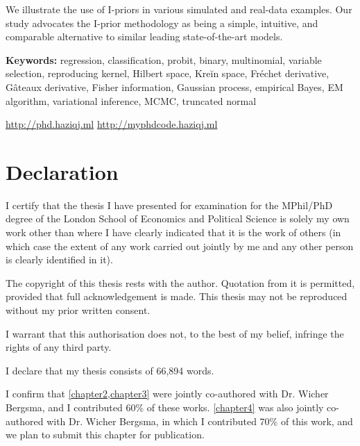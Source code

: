 \documentclass[11pt,twoside,openright,showframe]{report}
\begin{document}
We illustrate the use of I-priors in various simulated and real-data examples. 
Our study advocates the I-prior methodology as being a simple, intuitive, and comparable alternative to similar leading state-of-the-art models. 


\vspace{1em}
{\noindent\textbf{Keywords:} 
	regression, classification, probit, binary, multinomial, variable selection, reproducing kernel, Hilbert space, Kreĭn space, Fréchet derivative, Gâteaux derivative, Fisher information, Gaussian process, empirical Bayes, EM algorithm, variational inference, MCMC, truncated normal
}

\vfill

\begin{center}
  \url{http://phd.haziqj.ml} \textbullet{} \url{http://myphdcode.haziqj.ml}
\end{center}

\chapter*{Declaration} 

I certify that the thesis I have presented for examination for the MPhil/PhD degree of the London School of Economics and Political Science is solely my own work other than where I have clearly indicated that it is the work of others (in which case the extent of any work carried out jointly by me and any other person is clearly identified in it).

The copyright of this thesis rests with the author. Quotation from it is permitted, provided that full acknowledgement is made. 
This thesis may not be reproduced without my prior written consent.

I warrant that this authorisation does not, to the best of my belief, infringe the rights of any third party.

I declare that my thesis consists of 66,894 words.

I confirm that \cref{chapter2,chapter3} were jointly co-authored with Dr. Wicher Bergsma, and I contributed 60\% of these works.
\cref{chapter4} was also jointly co-authored with Dr. Wicher Bergsma, in which I contributed 70\% of this work, and we plan to submit this chapter for publication.
\end{document}
